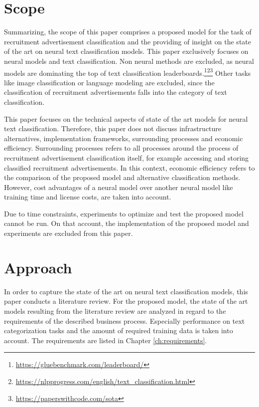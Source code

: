 \section{Scope}
Summarizing, the scope of this paper comprises a proposed model for the task of recruitment advertisement classification and the providing of insight on the state of the art on neural text classification models. This paper exclusively focuses on neural models and text classification. Non neural methods are excluded, as neural models are dominating the top of text classification leaderboards.\footnote{\url{https://gluebenchmark.com/leaderboard/}}\footnote{\url{https://nlpprogress.com/english/text_classification.html}}\footnote{\url{https://paperswithcode.com/sota}} Other tasks like image classification or language modeling are excluded, since the classification of recruitment advertisements falls into the category of text classification.
\par
This paper focuses on the technical aspects of state of the art models for neural text classification. Therefore, this paper does not discuss infrastructure alternatives, implementation frameworks, surrounding processes and economic efficiency. Surrounding processes refers to all processes around the process of recruitment advertisement classification itself, for example accessing and storing classified recruitment advertisements. In this context, economic efficiency refers to the comparison of the proposed model and alternative classification methods. However, cost advantages of a neural model over another neural model like training time and license costs, are taken into account.
\par
Due to time constraints, experiments to optimize and test the proposed model cannot be run. On that account, the implementation of the proposed model and experiments are excluded from this paper.

\section{Approach}
In order to capture the state of the art on neural text classification models, this paper conducts a literature review. For the proposed model, the state of the art models resulting  from the literature review are analyzed in regard to the requirements of the described business process. Especially performance on text categorization tasks and the amount of required training data is taken into account. The requirements are listed in Chapter \ref{ch:requirements}.
\newpage
